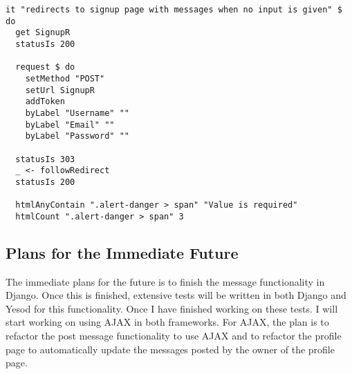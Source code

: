 \lstset{language=Haskell}

\begin{lstlisting}[caption="A Yesod Test"]
it "redirects to signup page with messages when no input is given" $ do
  get SignupR
  statusIs 200

  request $ do
    setMethod "POST"
    setUrl SignupR
    addToken
    byLabel "Username" ""
    byLabel "Email" ""
    byLabel "Password" ""

  statusIs 303
  _ <- followRedirect
  statusIs 200

  htmlAnyContain ".alert-danger > span" "Value is required"
  htmlCount ".alert-danger > span" 3
\end{lstlisting}

\subsection{Plans for the Immediate Future}

The immediate plans for the future is to finish the message functionality in Django. Once this is finished, extensive tests will be written in both Django and Yesod for this functionality. Once I have finished working on these tests. I will start working on using AJAX in both frameworks. For AJAX, the plan is to refactor the post message functionality to use AJAX and to refactor the profile page to automatically update the messages posted by the owner of the profile page.
